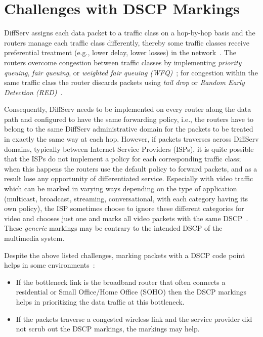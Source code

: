 

\section{Challenges with DSCP Markings}
\label{rg.ch.dscp}

DiffServ assigns each data packet to a traffic class on a hop-by-hop basis and
the routers manage each traffic class differently, thereby some traffic
classes receive preferential treatment (e.g., lower delay, lower losses) in
the network~\cite{rfc2475}. The routers overcome congestion between traffic
classes by implementing \emph{priority queuing}, \emph{fair queuing}, or
\emph{weighted fair queuing (WFQ)}~\cite{rfc4594}; for congestion within the
same traffic class the router discards packets using \emph{tail drop} or
\emph{Random Early Detection (RED)}~\cite{Floyd:RED}.

Consequently, DiffServ needs to be implemented on every router along the data
path and configured to have the same forwarding policy, i.e., the routers have
to belong to the same DiffServ administrative domain for the packets to be
treated in exactly the same way at each hop. However, if packets traverses
across DiffServ domains, typically between Internet Service Providers (ISPs),
it is quite possible that the ISPs do not implement a policy for each
corresponding traffic class; when this happens the routers use the default
policy to forward packets, and as a result lose any opportunity of
differentiated service. Especially with video traffic which can be marked in
varying ways depending on the type of application (multicast, broadcast,
streaming, conversational, with each category having its own policy), the ISP
sometimes choose to ignore these different categories for video and chooses
just one and marks all video packets with the same DSCP~\cite{rfc5865}. These
\emph{generic} markings may be contrary to the intended DSCP of the multimedia
system.



Despite the above listed challenges, marking packets with a DSCP code point
helps in some environments~\cite{draft.rtcweb.qos}:

\begin{itemize}

 \item If the bottleneck link is the broadband router that often connects a
residential or Small Office/Home Office (SOHO) then the DSCP markings helps in
prioritizing the data traffic at this bottleneck.

	\item If the packets traverse a congested wireless link and the service 
	provider did not scrub out the DSCP markings, the markings may help.

\end{itemize}

